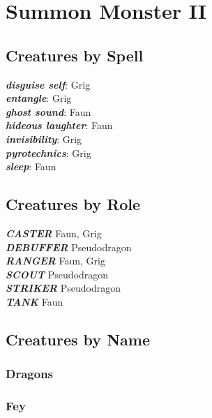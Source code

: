 \newpage

\def \levelnminusonenumsummons{1d3}
\def \levelnnumsummons{1}

\chapter{Summon Monster II}
\newpage

\section{Creatures by Spell}

\vspace{10pt}

\textbf{\textit{disguise self}}: Grig \\
\textbf{\textit{entangle}}: Grig \\
\textbf{\textit{ghost sound}}: Faun \\
\textbf{\textit{hideous laughter}}: Faun \\
\textbf{\textit{invisibility}}: Grig \\
\textbf{\textit{pyrotechnics}}: Grig  \\
\textbf{\textit{sleep}}: Faun \\

\newpage

\section{Creatures by Role}

\vspace{5pt}

\textbf{\textit{CASTER}} Faun, Grig \\

\textbf{\textit{DEBUFFER}} Pseudodragon \\

\textbf{\textit{RANGER}} Faun, Grig \\

\textbf{\textit{SCOUT}} Pseudodragon \\

\textbf{\textit{STRIKER}} Pseudodragon \\

\textbf{\textit{TANK}} Faun \\

\newpage

\section{Creatures by Name} 

\subsection{Dragons}

\subsection{Fey}



